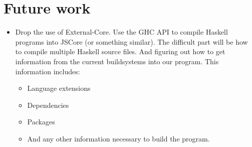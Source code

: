 
\chapter{Future work}

\begin{itemize}

\item Drop the use of External-Core. Use the GHC API to compile Haskell programs
into JSCore (or something similar). The difficult part will be how to compile
multiple Haskell source files. And figuring out how to get information from the
current buildsystems into our program. This information includes:

\begin{itemize}

\item Language extensions
\item Dependencies
\item Packages
\item And any other information necessary to build the program.

\end{itemize}

\end{itemize}
